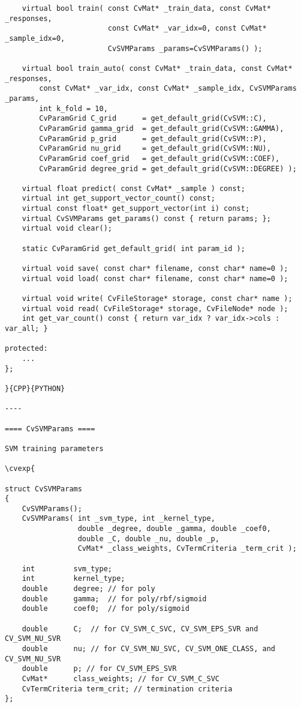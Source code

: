 \begin{verbatim}
    virtual bool train( const CvMat* _train_data, const CvMat* _responses,
                        const CvMat* _var_idx=0, const CvMat* _sample_idx=0,
                        CvSVMParams _params=CvSVMParams() );

    virtual bool train_auto( const CvMat* _train_data, const CvMat* _responses,
        const CvMat* _var_idx, const CvMat* _sample_idx, CvSVMParams _params,
        int k_fold = 10,
        CvParamGrid C_grid      = get_default_grid(CvSVM::C),
        CvParamGrid gamma_grid  = get_default_grid(CvSVM::GAMMA),
        CvParamGrid p_grid      = get_default_grid(CvSVM::P),
        CvParamGrid nu_grid     = get_default_grid(CvSVM::NU),
        CvParamGrid coef_grid   = get_default_grid(CvSVM::COEF),
        CvParamGrid degree_grid = get_default_grid(CvSVM::DEGREE) );

    virtual float predict( const CvMat* _sample ) const;
    virtual int get_support_vector_count() const;
    virtual const float* get_support_vector(int i) const;
    virtual CvSVMParams get_params() const { return params; };
    virtual void clear();

    static CvParamGrid get_default_grid( int param_id );

    virtual void save( const char* filename, const char* name=0 );
    virtual void load( const char* filename, const char* name=0 );

    virtual void write( CvFileStorage* storage, const char* name );
    virtual void read( CvFileStorage* storage, CvFileNode* node );
    int get_var_count() const { return var_idx ? var_idx->cols : var_all; }

protected:
    ...
};

}{CPP}{PYTHON}

----

==== CvSVMParams ====

SVM training parameters

\cvexp{

struct CvSVMParams
{
    CvSVMParams();
    CvSVMParams( int _svm_type, int _kernel_type,
                 double _degree, double _gamma, double _coef0,
                 double _C, double _nu, double _p,
                 CvMat* _class_weights, CvTermCriteria _term_crit );

    int         svm_type;
    int         kernel_type;
    double      degree; // for poly
    double      gamma;  // for poly/rbf/sigmoid
    double      coef0;  // for poly/sigmoid

    double      C;  // for CV_SVM_C_SVC, CV_SVM_EPS_SVR and CV_SVM_NU_SVR
    double      nu; // for CV_SVM_NU_SVC, CV_SVM_ONE_CLASS, and CV_SVM_NU_SVR
    double      p; // for CV_SVM_EPS_SVR
    CvMat*      class_weights; // for CV_SVM_C_SVC
    CvTermCriteria term_crit; // termination criteria
};


\end{verbatim}
